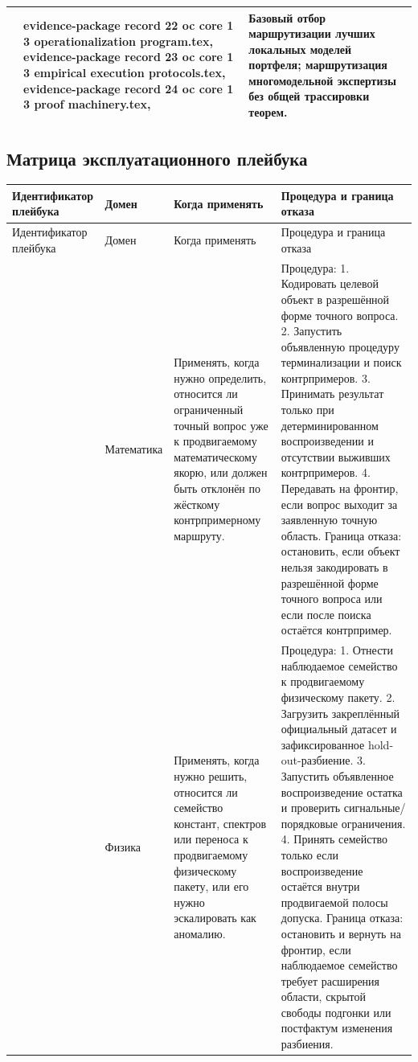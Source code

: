 \begin{longtable}{@{}L{0.16\textwidth}L{0.38\textwidth}L{0.34\textwidth}@{}}
 & evidence-package record 22 oc core 1 3 operationalization program.tex, \allowbreak evidence-package record 23 oc core 1 3 empirical execution protocols.tex, \allowbreak evidence-package record 24 oc core 1 3 proof machinery.tex, \allowbreak {} & Базовый отбор маршрутизации лучших локальных моделей портфеля; маршрутизация многомодельной экспертизы без общей трассировки теорем. \\
\bottomrule
\end{longtable}

\subsection{Матрица эксплуатационного плейбука}
\begin{longtable}{@{}L{0.15\textwidth}L{0.13\textwidth}L{0.18\textwidth}L{0.38\textwidth}@{}}
\toprule
Идентификатор плейбука & Домен & Когда применять & Процедура и граница отказа \\
\midrule
\endfirsthead
\toprule
Идентификатор плейбука & Домен & Когда применять & Процедура и граница отказа \\
\midrule
\endhead
{} & Математика & Применять, когда нужно определить, относится ли ограниченный точный вопрос уже к продвигаемому математическому якорю, или должен быть отклонён по жёсткому контрпримерному маршруту. & Процедура: 1. Кодировать целевой объект в разрешённой форме точного вопроса. 2. Запустить объявленную процедуру терминализации и поиск контрпримеров. 3. Принимать результат только при детерминированном воспроизведении и отсутствии выживших контрпримеров. 4. Передавать на фронтир, если вопрос выходит за заявленную точную область. \allowbreak Граница отказа: остановить, если объект нельзя закодировать в разрешённой форме точного вопроса или если после поиска остаётся контрпример. \\
 & Физика & Применять, когда нужно решить, относится ли семейство констант, спектров или переноса к продвигаемому физическому пакету, или его нужно эскалировать как аномалию. & Процедура: 1. Отнести наблюдаемое семейство к продвигаемому физическому пакету. 2. Загрузить закреплённый официальный датасет и зафиксированное hold-out-разбиение. 3. Запустить объявленное воспроизведение остатка и проверить сигнальные/порядковые ограничения. 4. Принять семейство только если воспроизведение остаётся внутри продвигаемой полосы допуска. \allowbreak Граница отказа: остановить и вернуть на фронтир, если наблюдаемое семейство требует расширения области, скрытой свободы подгонки или постфактум изменения разбиения. \\

\end{longtable}
